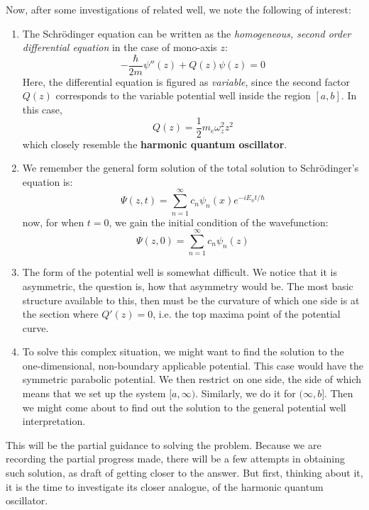 Now, after some investigations of related well, we note the following of interest: 
\begin{enumerate}
  \item The Schrödinger equation can be written as the \textit{homogeneous, second order differential equation} in the case of mono-axis $z$: \begin{equation}
    - \frac{\hbar}{2m} \psi''(z) + Q(z) \psi(z) = 0
  \end{equation}
  Here, the differential equation is figured as \textit{variable}, since the second factor $Q(z)$ corresponds to the variable potential well inside the region $[a,b]$. In this case, \begin{equation}
    Q(z) = \frac{1}{2}m_e \omega_{z}^{2}z^{2} 
  \end{equation}
  which closely resemble the \textbf{harmonic quantum oscillator}. 
  \item We remember the general form solution of the total solution to Schrödinger's equation is: \begin{equation}
    \Psi(z,t) = \sum_{n=1}^{\infty} c_n \psi_n (x) e^{-iE_n t/ \hbar}
  \end{equation}
  now, for when $t= 0$, we gain the initial condition of the wavefunction: 
  \begin{equation}
    \Psi(z,0) = \sum^{\infty}_{n=1} c_n \psi_n(z)
  \end{equation}
  \item The form of the potential well is somewhat difficult. We notice that it is asymmetric, the question is, how that asymmetry would be. The most basic structure available to this, then must be the curvature of which one side is at the section where $Q'(z)=0$, i.e. the top maxima point of the potential curve. 
  \item To solve this complex situation, we might want to find the solution to the one-dimensional, non-boundary applicable potential. This case would have the symmetric parabolic potential. We then restrict on one side, the side of which means that we set up the system $[a,\infty)$. Similarly, we do it for $(\infty, b]$. Then we might come about to find out the solution to the general potential well interpretation.
\end{enumerate}
This will be the partial guidance to solving the problem. Because we are recording the partial progress made, there will be a few attempts in obtaining such solution, as draft of getting closer to the answer. But first, thinking about it, it is the time to investigate its closer analogue, of the harmonic quantum oscillator. 


